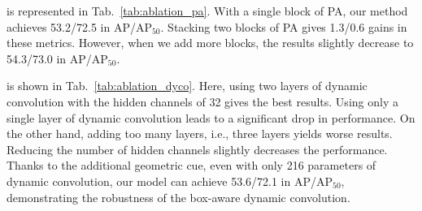 \documentclass[10pt,twocolumn,letterpaper]{article}
\begin{document}
 is represented in Tab.~\ref{tab:ablation_pa}. With a single block of PA, our method achieves 53.2/72.5 in AP/AP$_{50}$. Stacking two blocks of PA gives 1.3/0.6 gains in these metrics. However, when we add more blocks, the results slightly decrease to 54.3/73.0 in AP/AP$_{50}$.

 is shown in Tab.~\ref{tab:ablation_dyco}. 
Here, using two layers of dynamic convolution with the hidden channels of 32 gives the best results. Using only a single layer of dynamic convolution leads to a significant drop in performance. On the other hand, adding too many layers, i.e., three layers yields worse results. Reducing the number of hidden channels slightly decreases the performance. Thanks to the additional geometric cue, even with only 216 parameters of dynamic convolution, our model can achieve 53.6/72.1 in AP/AP$_{50}$, demonstrating the robustness of the box-aware dynamic convolution.
\end{document}
